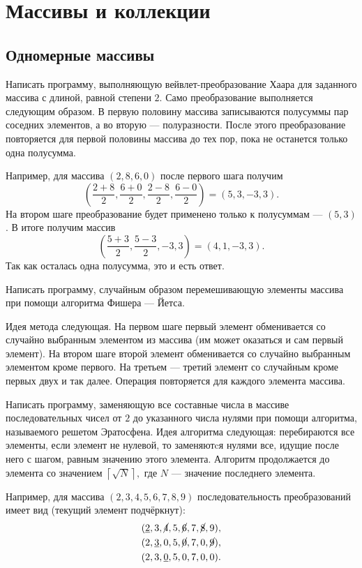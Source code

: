 \section{Массивы и коллекции}


\subsection{Одномерные массивы}

\task Написать программу, выполняющую вейвлет-преобразование
Хаара для заданного массива с
длиной, равной степени $2$. Само преобразование выполняется следующим
образом. В первую половину массива записываются полусуммы пар соседних
элементов, а во вторую — полуразности. После этого преобразование
повторяется для первой половины массива до тех пор, пока не останется
только одна полусумма.

Например, для массива $(2, 8, 6, 0)$ после первого шага получим
\[
\left(\frac{2+8}2, \frac{6+0}2, \frac{2-8}2, \frac{6-0}2\right) = (5, 3, -3, 3).
\]
На втором шаге преобразование будет применено только к полусуммам —
$(5, 3)$. В итоге получим массив
\[
\left(\frac{5+3}2, \frac{5-3}2, -3, 3\right) = (4, 1, -3, 3).
\]
Так как осталась одна полусумма, это и есть ответ.

\task Написать программу, случайным образом перемешивающую элементы
массива при помощи алгоритма Фишера — Йетса.

Идея метода следующая. На первом шаге первый элемент обменивается со
случайно выбранным элементом из массива (им может оказаться и сам
первый элемент). На втором шаге второй элемент обменивается со
случайно выбранным элементом кроме первого. На третьем — третий
элемент со случайным кроме первых двух и так далее. Операция
повторяется для каждого элемента массива.

\task Написать программу, заменяющую все составные числа в массиве
последовательных чисел от $2$ до указанного числа нулями при помощи
алгоритма, называемого решетом Эратосфена.
Идея алгоритма следующая: перебираются все элементы, если элемент не
нулевой, то заменяютcя нулями все, идущие после него с шагом, равным
значению этого элемента. Алгоритм продолжается до элемента со
значением $\left\lceil\sqrt N\right\rceil,$ где $N$ — значение
последнего элемента.

Например, для массива $(2, 3, 4, 5, 6, 7, 8, 9)$ последовательность
преобразований имеет вид (текущий элемент подчёркнут):
\begin{eqnarray*}
&(\underline2, 3, \cancel4, 5, \cancel6, 7, \cancel8, 9),\\
&(2, \underline3, 0, 5, \cancel0, 7, 0, \cancel9),\\
&(2, 3, \underline0, 5, 0, 7, 0, 0).
\end{eqnarray*}

